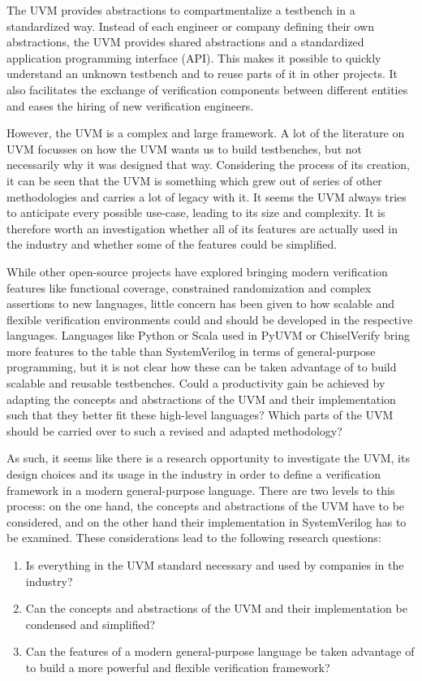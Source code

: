 The UVM provides abstractions to compartmentalize a testbench in a standardized way. Instead of each engineer or
company defining their own abstractions, the UVM provides shared abstractions and a standardized application
programming interface (API). This makes it possible to quickly
understand an unknown testbench and to reuse parts of it in other projects. It also facilitates the exchange of
verification components between different entities and eases the hiring of new verification engineers.

However, the UVM is a complex and large framework. A lot of the literature on UVM focusses on how the UVM wants us to
build testbenches, but not necessarily why it was designed that way. Considering the process of its creation, it can
be seen that the UVM is something which grew
out of series of other methodologies and carries a lot of legacy with it. It seems the UVM always tries to anticipate
every possible use-case, leading to its size and complexity. It is therefore worth an investigation whether all of
its features are actually used in the industry and whether some of the features could be simplified.

While other open-source projects have explored bringing modern verification features like functional coverage,
constrained randomization and complex assertions to new languages, little concern has been given to how scalable and
flexible verification environments could and should be developed in the respective languages. Languages like Python
or Scala used in PyUVM or ChiselVerify bring more features to the table than SystemVerilog in terms of
general-purpose programming, but it is not clear how these can be taken advantage of to build scalable and reusable
testbenches. Could a productivity gain be achieved by adapting the concepts and abstractions of the UVM and their
implementation such that they better fit these high-level languages? Which parts of the UVM should be carried over to
such a revised and adapted methodology?

As such, it seems like there is a research opportunity to investigate the UVM, its design choices and its usage in
the industry in order to define a verification framework in a modern general-purpose language. There are two levels
to this process: on the one hand, the concepts and abstractions of the UVM have to be considered, and on the other
hand their implementation in SystemVerilog has to be examined. These considerations lead to the following research questions:

\begin{enumerate}
  \item Is everything in the UVM standard necessary and used by companies in the industry?
  \item Can the concepts and abstractions of the UVM and their implementation be condensed and simplified?
  \item Can the features of a modern general-purpose language be taken advantage of to build a more powerful and
    flexible verification framework?
\end{enumerate}


